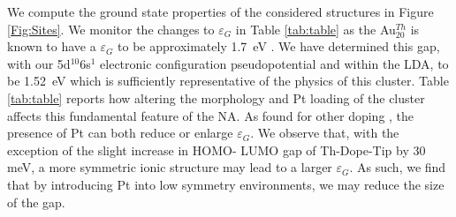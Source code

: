 We compute the ground state properties of the considered structures in Figure \ref{Fig:Sites}. We monitor the changes to $\varepsilon_{G}$ in Table \ref{tab:table} as the Au$_{20}^{Th}$ is known to have a $\varepsilon_{G}$ to be approximately 1.7~eV \cite{Au20Homo_Lumo,Baletto2015}. We have determined this gap, with our 5d$^{10}$6s$^{1}$ electronic configuration pseudopotential and within the LDA, to be 1.52~eV which is sufficiently representative of the physics of this cluster. Table \ref{tab:table} reports how altering the morphology and Pt loading of the cluster affects this fundamental feature of the NA. As found for other doping \cite{Baletto2015}, the presence of Pt can both reduce or enlarge $\varepsilon_{G}$. 
We observe that, with the exception of the slight increase in HOMO- LUMO gap of Th-Dope-Tip by 30 meV, a more symmetric ionic structure may lead to a larger $\varepsilon_{G}$. As such, we find that by introducing Pt into low symmetry environments, we may reduce the size of the gap.
%
